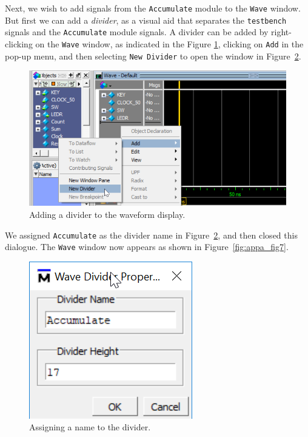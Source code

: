 \documentclass[11pt, twoside, pdftex]{article}
\begin{document}
\noindent
Next, we wish to add signals from the \texttt{Accumulate} module to the \texttt{Wave} window. 
But first we can add a {\it divider}, as a visual aid that separates the \texttt{testbench} 
signals and the \texttt{Accumulate} module signals. A divider can be added by
right-clicking on the \texttt{Wave} window, as indicated in the Figure \ref{fig:appa_fig5}, 
clicking on \texttt{Add} in the pop-up menu, and then selecting \texttt{New Divider} to 
open the window in Figure~\ref{fig:appa_fig6}. 

\begin{figure}[hb!]
	\begin{center}
		\includegraphics[]{figures/appa_fig5.png}
	\end{center}
		  \caption{Adding a divider to the waveform display.}
	\label{fig:appa_fig5}
\end{figure}

\noindent
We assigned \texttt{Accumulate} as the divider name in Figure~\ref{fig:appa_fig6},
and then closed this dialogue. The \texttt{Wave} window now appears as shown in 
Figure~\ref{fig:appa_fig7}.

\begin{figure}[h]
	\begin{center}
		\includegraphics[scale=0.8]{figures/appa_fig6.png}
	\end{center}
		  \caption{Assigning a name to the divider.}
	\label{fig:appa_fig6}
\end{figure}
\end{document}
